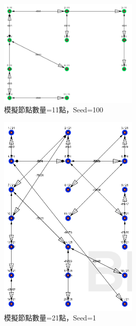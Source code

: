 \begin{ZhChapter}
\begin{figure}[H]
    \centering
    \includegraphics[width = 0.6\textwidth]{image/模擬實驗11點seed=100.png}
    \caption{模擬節點數量=11點，Seed=100}
    \label{fig: 模擬實驗11點seed=100}
\end{figure}

\begin{figure}[H]
    \centering
    \includegraphics[width = 0.6\textwidth]{image/模擬實驗21點seed=1.png}
    \caption{模擬節點數量=21點，Seed=1}
    \label{fig: 模擬實驗21點seed=1}
\end{figure}


\end{ZhChapter}

